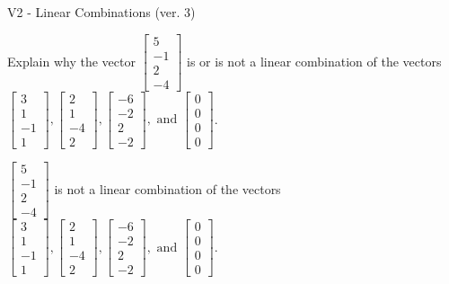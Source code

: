 \begin{exercise}
  \begin{exerciseTitle}V2 - Linear Combinations (ver. 3)\end{exerciseTitle}
  \begin{exerciseStatement}
    Explain why the vector \(\left[\begin{array}{c}
5 \\
-1 \\
2 \\
-4
\end{array}\right]\)  is or is not a linear 
	combination of the vectors \(\left[\begin{array}{c}
3 \\
1 \\
-1 \\
1
\end{array}\right] , \left[\begin{array}{c}
2 \\
1 \\
-4 \\
2
\end{array}\right] , \left[\begin{array}{c}
-6 \\
-2 \\
2 \\
-2
\end{array}\right] , \text{ and } \left[\begin{array}{c}
0 \\
0 \\
0 \\
0
\end{array}\right]\).
	


  \end{exerciseStatement}
  \begin{exerciseAnswer}
   \(\left[\begin{array}{c}
5 \\
-1 \\
2 \\
-4
\end{array}\right]\) 
  	 is not  
	a linear combination of the vectors \(\left[\begin{array}{c}
3 \\
1 \\
-1 \\
1
\end{array}\right] , \left[\begin{array}{c}
2 \\
1 \\
-4 \\
2
\end{array}\right] , \left[\begin{array}{c}
-6 \\
-2 \\
2 \\
-2
\end{array}\right] , \text{ and } \left[\begin{array}{c}
0 \\
0 \\
0 \\
0
\end{array}\right]\).


\end{exerciseAnswer}
\end{exercise}
